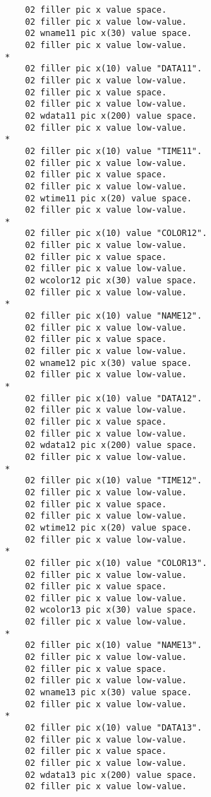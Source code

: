 {{{\begin{verbatim}
          02 filler pic x value space.
          02 filler pic x value low-value.
          02 wname11 pic x(30) value space.
          02 filler pic x value low-value.
      *    
          02 filler pic x(10) value "DATA11".
          02 filler pic x value low-value.
          02 filler pic x value space.
          02 filler pic x value low-value.
          02 wdata11 pic x(200) value space.
          02 filler pic x value low-value.
      *    
          02 filler pic x(10) value "TIME11".
          02 filler pic x value low-value.
          02 filler pic x value space.
          02 filler pic x value low-value.
          02 wtime11 pic x(20) value space.
          02 filler pic x value low-value.
      *    
          02 filler pic x(10) value "COLOR12".
          02 filler pic x value low-value.
          02 filler pic x value space.
          02 filler pic x value low-value.
          02 wcolor12 pic x(30) value space.
          02 filler pic x value low-value.
      *    
          02 filler pic x(10) value "NAME12".
          02 filler pic x value low-value.
          02 filler pic x value space.
          02 filler pic x value low-value.
          02 wname12 pic x(30) value space.
          02 filler pic x value low-value.
      *    
          02 filler pic x(10) value "DATA12".
          02 filler pic x value low-value.
          02 filler pic x value space.
          02 filler pic x value low-value.
          02 wdata12 pic x(200) value space.
          02 filler pic x value low-value.
      *    
          02 filler pic x(10) value "TIME12".
          02 filler pic x value low-value.
          02 filler pic x value space.
          02 filler pic x value low-value.
          02 wtime12 pic x(20) value space.
          02 filler pic x value low-value.
      *    
          02 filler pic x(10) value "COLOR13".
          02 filler pic x value low-value.
          02 filler pic x value space.
          02 filler pic x value low-value.
          02 wcolor13 pic x(30) value space.
          02 filler pic x value low-value.
      *    
          02 filler pic x(10) value "NAME13".
          02 filler pic x value low-value.
          02 filler pic x value space.
          02 filler pic x value low-value.
          02 wname13 pic x(30) value space.
          02 filler pic x value low-value.
      *    
          02 filler pic x(10) value "DATA13".
          02 filler pic x value low-value.
          02 filler pic x value space.
          02 filler pic x value low-value.
          02 wdata13 pic x(200) value space.
          02 filler pic x value low-value.

\end{verbatim}}}}
